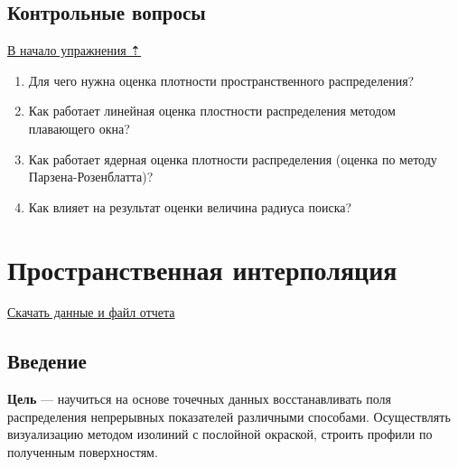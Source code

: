 \documentclass[12pt,]{book}
\begin{document}
\hypertarget{density-analysis-questions}{%
\section{Контрольные вопросы}\label{density-analysis-questions}}

\protect\hyperlink{density-analysis}{В начало упражнения ⇡}

\begin{enumerate}
\def\labelenumi{\arabic{enumi}.}
\item
  Для чего нужна оценка плотности пространственного распределения?
\item
  Как работает линейная оценка плостности распределения методом плавающего окна?
\item
  Как работает ядерная оценка плотности распределения (оценка по методу Парзена-Розенблатта)?
\item
  Как влияет на результат оценки величина радиуса поиска?
\end{enumerate}

\hypertarget{interpolation}{%
\chapter{Пространственная интерполяция}\label{interpolation}}

\href{http://autolab.geogr.msu.ru/gis/data/Ex17.zip}{Скачать данные и файл отчета}

\hypertarget{interpolation-intro}{%
\section{Введение}\label{interpolation-intro}}

\textbf{Цель} --- научиться на основе точечных данных восстанавливать поля распределения непрерывных показателей различными способами. Осуществлять визуализацию методом изолиний с послойной окраской, строить профили по полученным поверхностям.
\end{document}
